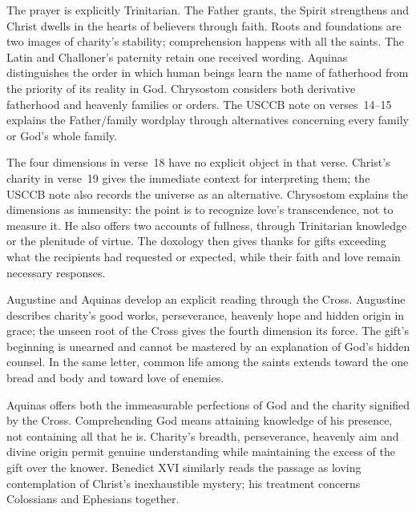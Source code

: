 The prayer is explicitly Trinitarian. The Father grants, the Spirit strengthens and Christ dwells in the hearts of believers through faith. Roots and foundations are two images of charity's stability; comprehension happens with all the saints. The Latin  and Challoner's paternity retain one received wording. Aquinas distinguishes the order in which human beings learn the name of fatherhood from the priority of its reality in God. Chrysostom considers both derivative fatherhood and heavenly families or orders. The USCCB note on verses~14--15 explains the Father/family wordplay through alternatives concerning every family or God's whole family. 

The four dimensions in verse~18 have no explicit object in that verse. Christ's charity in verse~19 gives the immediate context for interpreting them; the USCCB note also records the universe as an alternative. Chrysostom explains the dimensions as immensity: the point is to recognize love's transcendence, not to measure it. He also offers two accounts of fullness, through Trinitarian knowledge or the plenitude of virtue. The doxology then gives thanks for gifts exceeding what the recipients had requested or expected, while their faith and love remain necessary responses. 

Augustine and Aquinas develop an explicit reading through the Cross. Augustine describes charity's good works, perseverance, heavenly hope and hidden origin in grace; the unseen root of the Cross gives the fourth dimension its force. The gift's beginning is unearned and cannot be mastered by an explanation of God's hidden counsel. In the same letter, common life among the saints extends toward the one bread and body and toward love of enemies. 

Aquinas offers both the immeasurable perfections of God and the charity signified by the Cross. Comprehending God means attaining knowledge of his presence, not containing all that he is. Charity's breadth, perseverance, heavenly aim and divine origin permit genuine understanding while maintaining the excess of the gift over the knower. Benedict XVI similarly reads the passage as loving contemplation of Christ's inexhaustible mystery; his treatment concerns Colossians and Ephesians together. 

